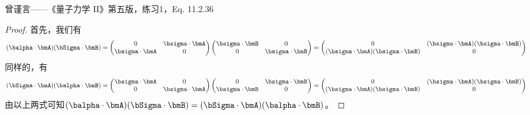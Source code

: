 曾谨言——《量子力学 II》第五版，练习1，Eq. 11.2.36
\begin{proof}
    首先，我们有
    \begin{equation}
            (\balpha \cdot \bmA) (\bSigma \cdot \bmB) =
            \begin{pmatrix}
                0                   &  \bsigma \cdot \bmA  \\
                \bsigma \cdot \bmA   & 0
            \end{pmatrix}
            \begin{pmatrix}
                \bsigma \cdot \bmB   & 0  \\
                0  &  \bsigma \cdot \bmB 
            \end{pmatrix}
        = \begin{pmatrix}
            0  &  (\bsigma \cdot \bmA) (\bsigma \cdot \bmB) \\
            (\bsigma \cdot \bmA) (\bsigma \cdot \bmB) &  0  \\
           \end{pmatrix} \\
    \end{equation}
    同样的，有
    \begin{equation}
            (\bSigma \cdot \bmA) (\balpha \cdot \bmB) =
            \begin{pmatrix}
                \bsigma \cdot \bmA   & 0  \\
                0  &  \bsigma \cdot \bmA 
            \end{pmatrix}
            \begin{pmatrix}
                0                   &  \bsigma \cdot \bmB  \\
                \bsigma \cdot \bmB   & 0
            \end{pmatrix}
        = \begin{pmatrix}
            0  &  (\bsigma \cdot \bmA) (\bsigma \cdot \bmB) \\
            (\bsigma \cdot \bmA) (\bsigma \cdot \bmB) &  0  \\
           \end{pmatrix} \\
    \end{equation}
    由以上两式可知$(\balpha\cdot\bmA)(\bSigma\cdot\bmB)=(\bSigma\cdot\bmA)(\balpha\cdot\bmB)$。


\end{proof}
